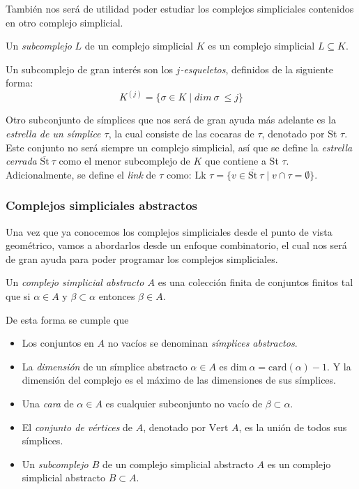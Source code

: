 También nos será de utilidad poder estudiar los complejos simpliciales contenidos en otro complejo simplicial.
\begin{definition}
Un \emph{subcomplejo} $L$ de un complejo simplicial $K$ es un complejo simplicial $L \subseteq K$.
\end{definition}

Un subcomplejo de gran interés son los \emph{$j$-esqueletos}, definidos de la siguiente forma: \[K^{(j)} = \{\sigma \in K \mid dim\ \sigma\ \leq j\}\]

Otro subconjunto de símplices que nos será de gran ayuda más adelante es la \emph{estrella de un símplice $\tau$}, la cual consiste de las cocaras de $\tau$, denotado por St $\tau$. Este conjunto no será siempre un complejo simplicial, así que se define la \emph{estrella cerrada} $\overline{\text{St}}\ \tau$ como el menor subcomplejo de $K$ que contiene a St $\tau$. Adicionalmente, se define el \emph{link} de $\tau$ como: $\text{Lk }\tau = \{v \in \overline{\text{St}}\ \tau \mid v \cap \tau = \emptyset\}$.

\subsubsection*{Complejos simpliciales abstractos}
Una vez que ya conocemos los complejos simpliciales desde el punto de vista geométrico, vamos a abordarlos desde un enfoque combinatorio, el cual nos será de gran ayuda para poder programar los complejos simpliciales.

\begin{definition}
Un \emph{complejo simplicial abstracto $A$} es una colección finita de conjuntos finitos tal que si $\alpha \in A$ y $\beta \subset \alpha$ entonces $\beta \in A$.
\end{definition}
De esta forma se cumple que
\begin{itemize}
	\item Los conjuntos en $A$ no vacíos se denominan \emph{símplices abstractos}.
	\item La \emph{dimensión} de un símplice abstracto $\alpha \in A$ es $\text{dim}\ \alpha = \text{card}(\alpha) - 1$. Y la dimensión del complejo es el máximo de las dimensiones de sus símplices.
	\item Una \emph{cara} de $\alpha \in A$ es cualquier subconjunto no vacío de $\beta \subset \alpha$.
	\item El \emph{conjunto de vértices} de $A$, denotado por $\text{Vert } A$, es la unión de todos sus símplices.
	\item Un \emph{subcomplejo $B$} de un complejo simplicial abstracto $A$ es un complejo simplicial abstracto $B \subset A$.
\end{itemize}

